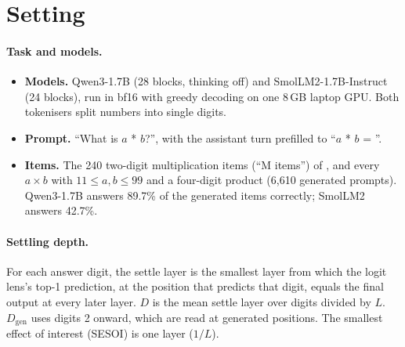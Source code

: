 \documentclass[11pt]{article}
\begin{document}
\section{Setting}

\paragraph{Task and models.}
\begin{itemize}
\item \textbf{Models.} Qwen3-1.7B (28 blocks, thinking off) and SmolLM2-1.7B-Instruct (24 blocks), run in bf16 with greedy decoding on one 8\,GB laptop GPU. Both tokenisers split numbers into single digits.
\item \textbf{Prompt.} ``What is $a$ * $b$?'', with the assistant turn prefilled to ``$a$ * $b$ = ''.
\item \textbf{Items.} The 240 two-digit multiplication items (``M items'') of \citet{ramdan2026crv2}, and every $a \times b$ with $11 \le a, b \le 99$ and a four-digit product (6,610 generated prompts). Qwen3-1.7B answers 89.7\% of the generated items correctly; SmolLM2 answers 42.7\%.
\end{itemize}

\paragraph{Settling depth.} For each answer digit, the settle layer is the smallest layer from which the logit lens's top-1 prediction, at the position that predicts that digit, equals the final output at every later layer. $D$ is the mean settle layer over digits divided by $L$. $D_\text{gen}$ uses digits 2 onward, which are read at generated positions. The smallest effect of interest (SESOI) is one layer ($1/L$).
\end{document}
